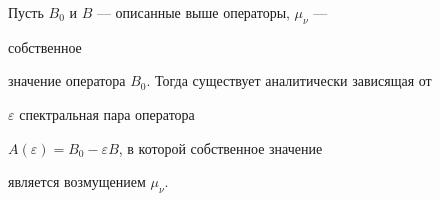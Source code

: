  


\begin{thmnonum} 


Пусть $B_0$ и $B$ --- описанные выше операторы, $\mu_\nu$ --- 


собственное 


значение оператора $B_0$. Тогда существует аналитически зависящая от 


$\varepsilon$ спектральная пара оператора 


$A(\varepsilon)=B_0-\varepsilon B$, в которой собственное значение 


является возмущением $\mu_\nu$. 


\end{thmnonum} 


 


